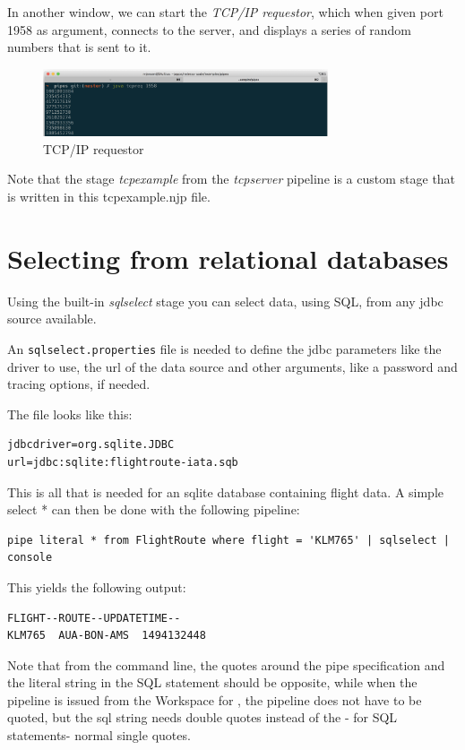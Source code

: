 In another window, we can start the \emph{TCP/IP requestor}, which
when given port 1958 as argument, connects to the server, and displays
a series of random numbers that is sent to it.

\begin{figure}[h]
  \includegraphics[width=0.75\textwidth]{images/tcpreq.png}
  \caption{TCP/IP requestor}
  \label{fig:tcpcompile}
\end{figure}

Note that the stage \emph{tcpexample} from the \emph{tcpserver}
pipeline is a custom stage that is written in this tcpexample.njp
file.

\chapter{Selecting from relational databases}

Using the built-in \emph{sqlselect} stage you can select data, using
SQL, from any jdbc source available.

An \texttt{sqlselect.properties} file is needed to define the jdbc parameters
like the driver to use, the url of the data source and other
arguments, like a password and tracing options, if needed.

The file looks like this:
\begin{verbatim}
jdbcdriver=org.sqlite.JDBC
url=jdbc:sqlite:flightroute-iata.sqb
\end{verbatim}

This is all that is needed for an sqlite database containing flight
data. A simple select * can then be done with the following pipeline:

\begin{lstlisting}
pipe literal * from FlightRoute where flight = 'KLM765' | sqlselect | console
\end{lstlisting}

This yields the following output:
\begin{verbatim}
FLIGHT--ROUTE--UPDATETIME--
KLM765  AUA-BON-AMS  1494132448
\end{verbatim}

\begin{shaded}
Note that from the command line, the quotes around the pipe
specification and the literal string in the SQL statement should be
opposite, while when the pipeline is issued from the Workspace for
\nr{}, the pipeline does not have to be quoted, but the sql string
needs double quotes instead of the - for SQL statements- normal single quotes.
\end{shaded}
